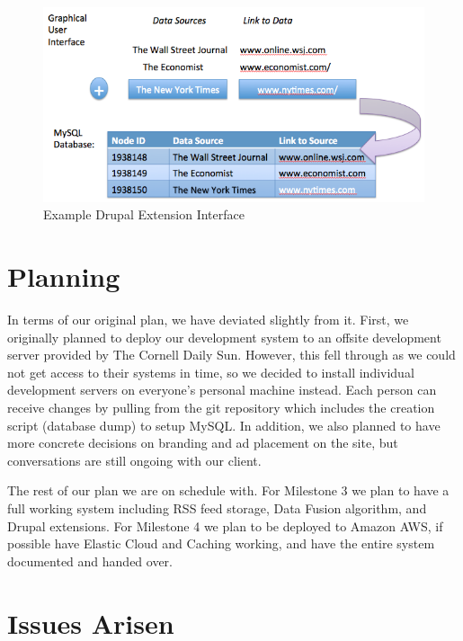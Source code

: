 \documentclass[12pt]{article} %
\begin{document}
\begin{figure}[htbp]
\begin{center}
\includegraphics[width=6in]{images/drupal_ext_interface}
\caption{Example Drupal Extension Interface}
\end{center}
\end{figure}

\section{Planning}

In terms of our original plan, we have deviated slightly from it. First, we originally planned to deploy our development system to an offsite development server provided by The Cornell Daily Sun. However, this fell through as we could not get access to their systems in time, so we decided to install individual development servers on everyone’s personal machine instead. Each person can receive changes by pulling from the git repository which includes the creation script (database dump) to setup MySQL. In addition, we also planned to have more concrete decisions on branding and ad placement on the site, but conversations are still ongoing with our client.

The rest of our plan we are on schedule with. For Milestone 3 we plan to have a full working system including RSS feed storage, Data Fusion algorithm, and Drupal extensions. For Milestone 4 we plan to be deployed to Amazon AWS, if possible have Elastic Cloud and Caching working, and have the entire system documented and handed over. 

\section{Issues Arisen}
\end{document}
